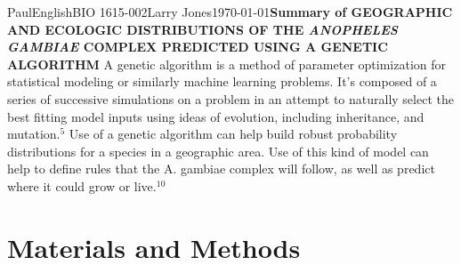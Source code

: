 \documentclass[10pt,twocolumn]{article}
\begin{document}
\begin{mla}{Paul}{English}{BIO 1615-002}{Larry Jones}{\today}{\textbf{Summary of GEOGRAPHIC AND ECOLOGIC DISTRIBUTIONS OF THE \textit{ANOPHELES GAMBIAE} COMPLEX PREDICTED USING A GENETIC ALGORITHM}}
A genetic algorithm is a method of parameter optimization for statistical modeling or similarly machine learning problems. It's composed of a series of successive simulations on a problem in an attempt to naturally select the best fitting model inputs using ideas of evolution, including inheritance, and mutation.$^5$ Use of a genetic algorithm can help build robust probability distributions for a species in a geographic area. Use of this kind of model can help to define rules that the A. gambiae complex will follow, as well as predict where it could grow or live.$^{10}$

\section{Materials and Methods}



\end{mla}
\end{document}

